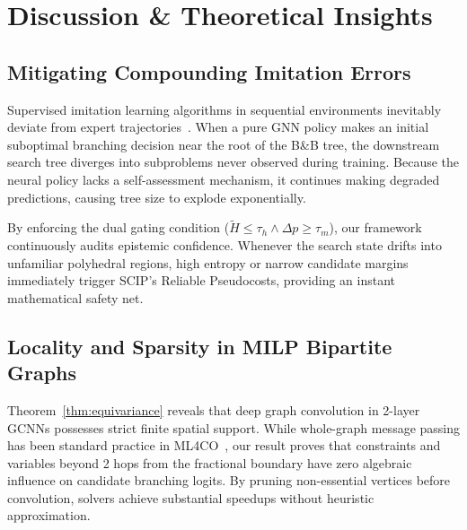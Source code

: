 \documentclass[10pt,twocolumn,letterpaper]{article}
\theoremstyle{plain}
\theoremstyle{definition}
\theoremstyle{remark}
\begin{document}
\section{Discussion \& Theoretical Insights}
\label{sec:discussion}

\subsection{Mitigating Compounding Imitation Errors}
Supervised imitation learning algorithms in sequential environments inevitably deviate from expert trajectories~\cite{ross2011reduction,bengio2021machine}. When a pure GNN policy makes an initial suboptimal branching decision near the root of the B\&B tree, the downstream search tree diverges into subproblems never observed during training. Because the neural policy lacks a self-assessment mechanism, it continues making degraded predictions, causing tree size to explode exponentially.

By enforcing the dual gating condition ($\tilde{H} \le \tau_h \land \Delta p \ge \tau_m$), our framework continuously audits epistemic confidence. Whenever the search state drifts into unfamiliar polyhedral regions, high entropy or narrow candidate margins immediately trigger SCIP's Reliable Pseudocosts, providing an instant mathematical safety net.

\subsection{Locality and Sparsity in MILP Bipartite Graphs}
Theorem~\ref{thm:equivariance} reveals that deep graph convolution in 2-layer GCNNs possesses strict finite spatial support. While whole-graph message passing has been standard practice in ML4CO~\cite{gasse2019exact,prouvost2020ecole}, our result proves that constraints and variables beyond 2 hops from the fractional boundary have zero algebraic influence on candidate branching logits. By pruning non-essential vertices before convolution, solvers achieve substantial speedups without heuristic approximation.
\end{document}
